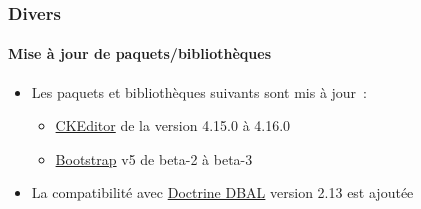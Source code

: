 %

\begin{frame}[fragile]
	\frametitle{Divers}
	\framesubtitle{Mise à jour de paquets/bibliothèques}

	\begin{itemize}
		\item Les paquets et bibliothèques suivants sont mis à jour~:
		\begin{itemize}
			\item \href{https://ckeditor.com/}{CKEditor} de la version 4.15.0 à 4.16.0
			\item \href{https://getbootstrap.com/}{Bootstrap} v5 de beta-2 à beta-3
		\end{itemize}
		\item La compatibilité avec
			\href{https://www.doctrine-project.org/projects/dbal.html}{Doctrine DBAL}
			version 2.13 est ajoutée
	\end{itemize}

\end{frame}


